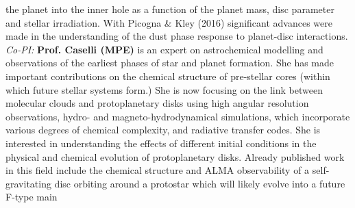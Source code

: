 \documentclass[12pt]{article}
\begin{document}
the planet into the inner hole as a function of the planet mass, disc
parameter and stellar irradiation. With Picogna \& Kley (2016)
significant advances were made in the understanding of the dust phase
response to planet-disc interactions. \\
{\it Co-PI:} {\bf Prof. Caselli (MPE)} 
is an expert on astrochemical
modelling and observations of the earliest phases of star and planet
formation. She has made important contributions on the chemical structure
of pre-stellar cores (within which future stellar systems form.)
She is
now focusing on the link between molecular clouds and protoplanetary
disks using high angular resolution observations, hydro- and
magneto-hydrodynamical simulations, which incorporate various degrees
of chemical complexity, and radiative transfer codes. She is
interested in understanding the effects of different initial
conditions in the physical and chemical evolution of protoplanetary
disks. Already published work in this field include the chemical
structure and ALMA observability of a self-gravitating disc orbiting
around a protostar which will likely evolve into a future F-type main
\end{document}
